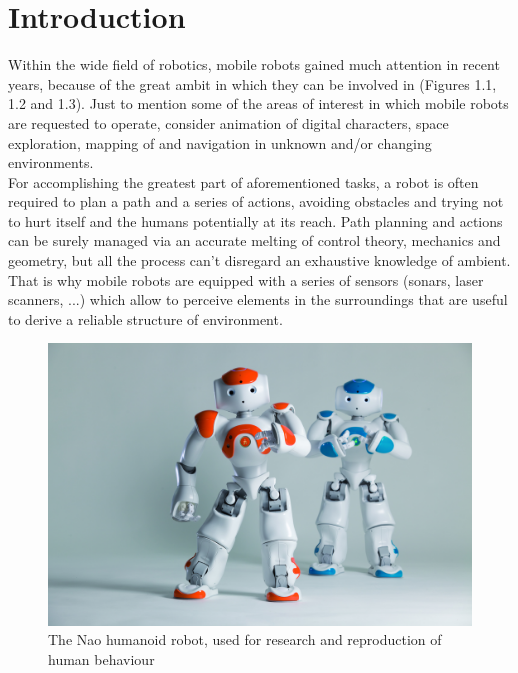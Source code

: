 \documentclass[a4paper, onecolumn]{report}
\begin{document}
\Large
\sloppy


\tableofcontents
\newpage

\chapter{Introduction}

Within the wide field of robotics, mobile robots gained much attention in recent years, because of the great ambit in which they can be involved in (Figures 1.1, 1.2 and 1.3). Just to mention some of the areas of interest in which mobile robots are requested to operate, consider animation of digital characters, space exploration, mapping of and navigation in unknown and/or changing environments. \\
For accomplishing the greatest part of aforementioned tasks, a robot is often required to plan a path and a series of actions, avoiding obstacles and trying not to hurt itself and the humans potentially at its reach. Path planning and actions can be surely managed via an accurate melting of control theory, mechanics and geometry, but all the process can't disregard an exhaustive knowledge of ambient. That is why mobile robots are equipped with a series of sensors (sonars, laser scanners, ...) which allow to perceive elements in the surroundings that are useful to derive a reliable structure of environment.
\begin{figure}[htb]
\centering
\centering\setlength{\captionmargin}{0pt}%
\includegraphics[width=.90\textwidth]{images/nao.jpg}
\caption{The Nao humanoid robot, used for research and reproduction of human behaviour}
\end{figure}
\end{document}
